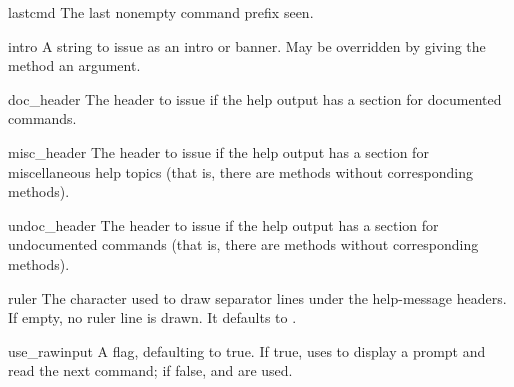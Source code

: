 \begin{memberdesc}{lastcmd}
The last nonempty command prefix seen. 
\end{memberdesc}

\begin{memberdesc}{intro}
A string to issue as an intro or banner.  May be overridden by giving
the  method an argument.
\end{memberdesc}

\begin{memberdesc}{doc_header}
The header to issue if the help output has a section for documented
commands.
\end{memberdesc}

\begin{memberdesc}{misc_header}
The header to issue if the help output has a section for miscellaneous 
help topics (that is, there are  methods without
corresponding  methods).
\end{memberdesc}

\begin{memberdesc}{undoc_header}
The header to issue if the help output has a section for undocumented 
commands (that is, there are  methods without
corresponding  methods).
\end{memberdesc}

\begin{memberdesc}{ruler}
The character used to draw separator lines under the help-message
headers.  If empty, no ruler line is drawn.  It defaults to
\character{=}.
\end{memberdesc}

\begin{memberdesc}{use_rawinput}
A flag, defaulting to true.  If true,  uses
 to display a prompt and read the next command;
if false,  and
 are used.
\end{memberdesc}
